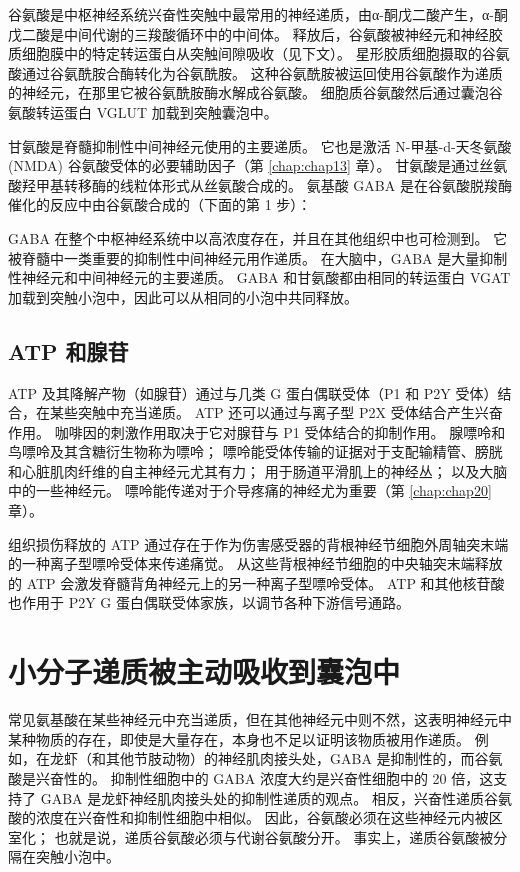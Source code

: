 谷氨酸是中枢神经系统兴奋性突触中最常用的神经递质，由α-酮戊二酸产生，α-酮戊二酸是中间代谢的三羧酸循环中的中间体。 
释放后，谷氨酸被神经元和神经胶质细胞膜中的特定转运蛋白从突触间隙吸收（见下文）。 
星形胶质细胞摄取的谷氨酸通过谷氨酰胺合酶转化为谷氨酰胺。 
这种谷氨酰胺被运回使用谷氨酸作为递质的神经元，在那里它被谷氨酰胺酶水解成谷氨酸。 
细胞质谷氨酸然后通过囊泡谷氨酸转运蛋白 VGLUT 加载到突触囊泡中。


甘氨酸是脊髓抑制性中间神经元使用的主要递质。 
它也是激活 N-甲基-d-天冬氨酸 (NMDA) 谷氨酸受体的必要辅助因子（第 \ref{chap:chap13} 章）。 
甘氨酸是通过丝氨酸羟甲基转移酶的线粒体形式从丝氨酸合成的。 
氨基酸 GABA 是在谷氨酸脱羧酶催化的反应中由谷氨酸合成的（下面的第 1 步）：


GABA 在整个中枢神经系统中以高浓度存在，并且在其他组织中也可检测到。 
它被脊髓中一类重要的抑制性中间神经元用作递质。 
在大脑中，GABA 是大量抑制性神经元和中间神经元的主要递质。 
GABA 和甘氨酸都由相同的转运蛋白 VGAT 加载到突触小泡中，因此可以从相同的小泡中共同释放。



\subsection{ATP 和腺苷}

ATP 及其降解产物（如腺苷）通过与几类 G 蛋白偶联受体（P1 和 P2Y 受体）结合，在某些突触中充当递质。 
ATP 还可以通过与离子型 P2X 受体结合产生兴奋作用。 
咖啡因的刺激作用取决于它对腺苷与 P1 受体结合的抑制作用。 
腺嘌呤和鸟嘌呤及其含糖衍生物称为嘌呤； 嘌呤能受体传输的证据对于支配输精管、膀胱和心脏肌肉纤维的自主神经元尤其有力； 用于肠道平滑肌上的神经丛； 以及大脑中的一些神经元。 嘌呤能传递对于介导疼痛的神经尤为重要（第 \ref{chap:chap20} 章）。


组织损伤释放的 ATP 通过存在于作为伤害感受器的背根神经节细胞外周轴突末端的一种离子型嘌呤受体来传递痛觉。 
从这些背根神经节细胞的中央轴突末端释放的 ATP 会激发脊髓背角神经元上的另一种离子型嘌呤受体。 
ATP 和其他核苷酸也作用于 P2Y G 蛋白偶联受体家族，以调节各种下游信号通路。



\section{小分子递质被主动吸收到囊泡中}
常见氨基酸在某些神经元中充当递质，但在其他神经元中则不然，这表明神经元中某种物质的存在，即使是大量存在，本身也不足以证明该物质被用作递质。 
例如，在龙虾（和其他节肢动物）的神经肌肉接头处，GABA 是抑制性的，而谷氨酸是兴奋性的。 
抑制性细胞中的 GABA 浓度大约是兴奋性细胞中的 20 倍，这支持了 GABA 是龙虾神经肌肉接头处的抑制性递质的观点。 
相反，兴奋性递质谷氨酸的浓度在兴奋性和抑制性细胞中相似。 
因此，谷氨酸必须在这些神经元内被区室化； 
也就是说，递质谷氨酸必须与代谢谷氨酸分开。 
事实上，递质谷氨酸被分隔在突触小泡中。



